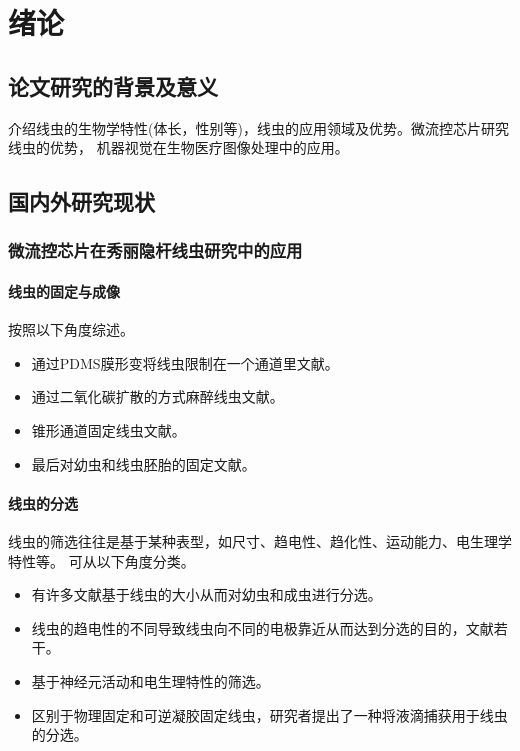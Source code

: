 
\chapter{绪论}
\label{chap:intro}

\section{论文研究的背景及意义}
\label{sec:intro:analog}
介绍线虫的生物学特性(体长，性别等)，线虫的应用领域及优势。微流控芯片研究线虫的优势，
机器视觉在生物医疗图像处理中的应用。
\section{国内外研究现状}
\label{sec:intro:analog}

\subsection{微流控芯片在秀丽隐杆线虫研究中的应用}
\label{sec:intro:analog}

\subsubsection{线虫的固定与成像}
\label{sec:intro:analog}
	按照以下角度综述。
	\begin{itemize}
	  \item 通过PDMS膜形变将线虫限制在一个通道里文献。
	  \item 通过二氧化碳扩散的方式麻醉线虫文献。
	  \item 锥形通道固定线虫文献。
	  \item 最后对幼虫和线虫胚胎的固定文献。
	\end{itemize}
\subsubsection{线虫的分选}
\label{sec:intro:analog}
	线虫的筛选往往是基于某种表型，如尺寸、趋电性、趋化性、运动能力、电生理学特性等。
	可从以下角度分类。
	\begin{itemize}
	  \item 有许多文献基于线虫的大小从而对幼虫和成虫进行分选。
	  \item 线虫的趋电性的不同导致线虫向不同的电极靠近从而达到分选的目的，文献若干。
	  \item 基于神经元活动和电生理特性的筛选。
	  \item 区别于物理固定和可逆凝胶固定线虫，研究者提出了一种将液滴捕获用于线虫的分选。
	\end{itemize}
